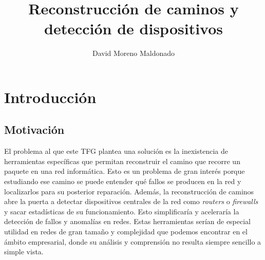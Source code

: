 \documentclass[tfg,epsbased,lof,lot,loa,covers,final,copyright,overleaf]{tfgtfmthesisuam}
\title{Reconstrucción de caminos y detección de dispositivos}
\author{David Moreno Maldonado}
\begin{document}
\chapter{Introducción}

\section{Motivación}
El problema al que este TFG plantea una solución es la inexistencia de herramientas específicas que permitan reconstruir el camino que recorre un paquete en una red informática. Esto es un problema de gran interés porque estudiando ese camino se puede entender qué fallos se producen en la red y localizarlos para su posterior reparación. Además, la reconstrucción de caminos abre la puerta a detectar dispositivos centrales de la red como \textit{routers} o \textit{firewalls} y sacar estadísticas de su funcionamiento. Esto simplificaría y aceleraría la detección de fallos y anomalías en redes. Estas herramientas serían de especial utilidad en redes de gran tamaño y complejidad que podemos encontrar en el ámbito empresarial, donde su análisis y comprensión no resulta siempre sencillo a simple vista.
\end{document}
